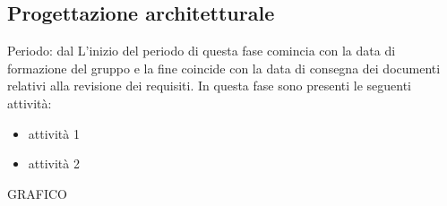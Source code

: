 \subsection{Progettazione architetturale}
Periodo: dal
L'inizio del periodo di questa fase comincia con la data di formazione del gruppo e la fine coincide con la data di consegna dei documenti relativi alla revisione dei requisiti. In questa fase sono presenti le seguenti attività:
\begin{itemize}
\item attività 1
\item attività 2
\end{itemize}

GRAFICO